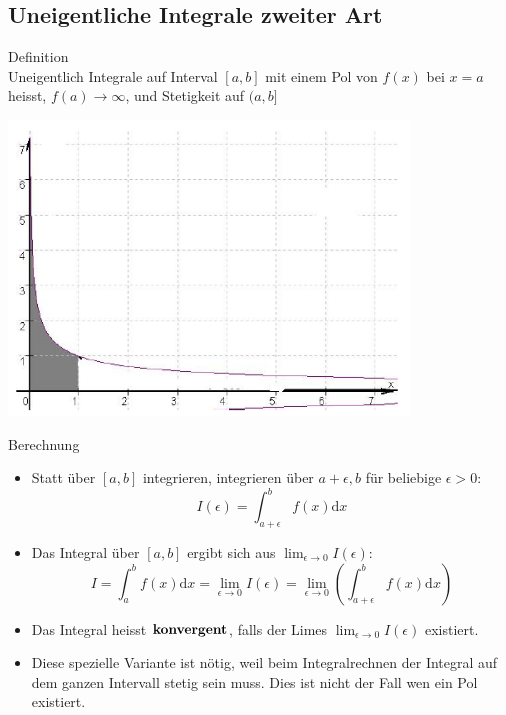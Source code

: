 \subsection{Uneigentliche Integrale zweiter Art}
	\begin{definition}{Definition}\\
		Uneigentlich Integrale auf Interval \([a,b]\) mit einem Pol von \(f(x)\) bei \(x=a\) heisst,
		\(f(a) \rightarrow \infty\), und Stetigkeit auf \((a,b]\)
	  \begin{centering}
	  \includegraphics[width=0.8\textwidth]{images/Uneigentlicher_Integral_Beispiel2.png}\\
	  \end{centering}
  \end{definition}
  \begin{KR}{Berechnung}\\
	  \begin{itemize}
\item Statt über \([a,b]\) integrieren, integrieren über \(a+\epsilon,b\) für beliebige \(\epsilon>0\):
	\[I(\epsilon)=\int_{a+\epsilon}^b{f(x)\mathrm{d}x}\]
\item Das Integral über \([a,b]\) ergibt sich aus \(\lim_{\epsilon \rightarrow 0}I(\epsilon)\):
	\[I=\int_a^b{f(x)\mathrm{d}x}=\underset{\epsilon \rightarrow 0}{\lim}I(\epsilon)=\underset{\epsilon \rightarrow
	0}{\lim}\left(\int_{a+\epsilon}^b{f(x)\mathrm{d}x}\right) \]
\item Das Integral heisst \(\bold{konvergent}\), falls der Limes \(\lim_{\epsilon \rightarrow 0}I(\epsilon)\) existiert.
\item Diese spezielle Variante ist nötig, weil beim Integralrechnen der Integral auf dem ganzen Intervall stetig sein
	muss. Dies ist nicht der Fall wen ein Pol existiert.
\end{itemize}
  \end{KR}
